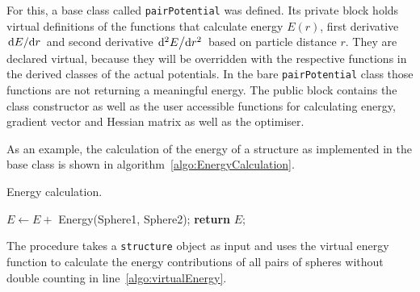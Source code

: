 For this, a base class called \verb|pairPotential| was defined. Its private
block holds virtual definitions of the functions that calculate energy $E(r)$,
first derivative $\dv*{E}{r}$ and second derivative $\dv*[2]{E}{r}$ based on
particle distance $r$. They are declared virtual, because they will be
overridden with the respective functions in the derived classes of the actual
potentials. In the bare \verb|pairPotential| class those functions are not
returning a meaningful energy. The public block contains the class constructor
as well as the user accessible functions for calculating energy, gradient
vector and Hessian matrix as well as the optimiser.

As an example, the calculation of the energy of a structure as implemented in
the base class is shown in algorithm~\ref{algo:EnergyCalculation}.
%
\begin{algorithm}
    \caption{Energy calculation.}
    \label{algo:EnergyCalculation}
    \begin{algorithmic}[1]
                \State $E\gets E +$ Energy(Sphere1, Sphere2);\label{algo:virtualEnergy}
        \EndFor
        \State \textbf{return} $E$;
        \EndProcedure
    \end{algorithmic}
\end{algorithm}
%
The procedure takes a \verb|structure| object as input and uses the virtual
energy function to calculate the energy contributions of all pairs of spheres
without double counting in line~\ref{algo:virtualEnergy}.

